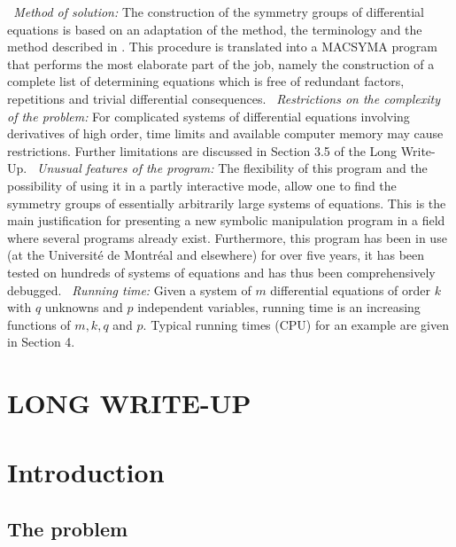 \pagebreak
\noindent
{\em \ Method of solution:}
\vskip 2pt
\noindent
The construction of the symmetry groups of
differential equations is based on an adaptation of the method, the
terminology and the method described in \cite{olverbook}. 
This procedure is translated into a MACSYMA 
\cite{macsymamanual,macsymausersguide} 
program that performs the most elaborate part of the job, namely
the construction of a complete list of determining equations which
is free of redundant factors, repetitions and trivial differential 
consequences.
\vskip 2pt
\noindent
{\em \ Restrictions on the complexity of the problem:}
\vskip 2pt
\noindent
For complicated systems of differential equations involving
derivatives of high order, time limits and available computer memory
may cause restrictions. Further limitations are discussed in Section 3.5 of
the Long Write-Up.
\vskip 2pt
\noindent
{\em \ Unusual features of the program:}
\vskip 2pt
\noindent
The flexibility of this program and the
possibility of using it in a partly interactive mode, allow one to find the 
symmetry groups of essentially arbitrarily large systems of equations.  
This is the main justification for
presenting a new symbolic manipulation program in a field where several
programs already exist.  Furthermore, this program has
been in use (at the Universit\'{e} de Montr\'{e}al and elsewhere) for over five
years, it has been tested on hundreds of systems of equations and has 
thus been comprehensively debugged.
\vskip 2pt
\noindent
{\em \ Running time:}
\vskip 2pt
\noindent
Given a system of $m$ differential equations of order $k$ with $q$ unknowns
and $p$ independent variables, running time is an increasing functions of
$m, k, q$ and $p$. Typical running times (CPU) for an example are given 
in Section 4.

\vfill
\newpage
{}

\section*{LONG WRITE-UP}
\section{Introduction}
\subsection{The problem}

